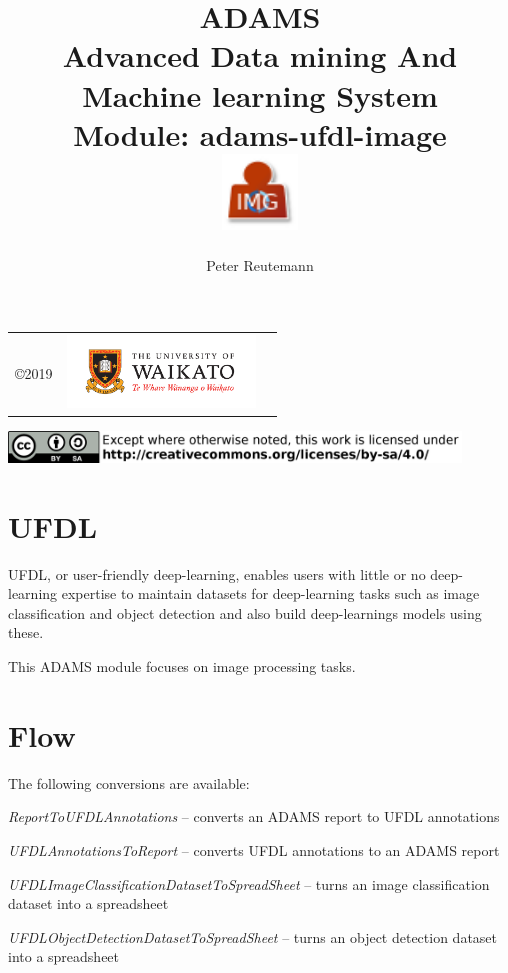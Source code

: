 \documentclass[a4paper]{book}
\title{
  \textbf{ADAMS} \\
  {\Large \textbf{A}dvanced \textbf{D}ata mining \textbf{A}nd \textbf{M}achine
  learning \textbf{S}ystem} \\
  {\Large Module: adams-ufdl-image} \\
  \vspace{1cm}
  \includegraphics[width=2cm]{images/ufdl-image-module.png} \\
}
\author{
  Peter Reutemann
}
\begin{document}
\begin{titlepage}
\maketitle

\thispagestyle{empty}
\center
\begin{table}[b]
	\begin{tabular}{c l l}
		\parbox[c][2cm]{2cm}{\copyright 2019} &
		\parbox[c][2cm]{5cm}{\includegraphics[width=5cm]{images/coat_of_arms.pdf}} \\
	\end{tabular}
	\includegraphics[width=12cm]{images/cc.png} \\
\end{table}

\end{titlepage}

\tableofcontents

\chapter{UFDL}
UFDL, or user-friendly deep-learning, enables users with little or no deep-learning
expertise to maintain datasets for deep-learning tasks such as image classification
and object detection and also build deep-learnings models using these.

This ADAMS module focuses on image processing tasks.

\chapter{Flow}

The following conversions are available:
\begin{tight_itemize}
  \item \textit{ReportToUFDLAnnotations} -- converts an ADAMS report to UFDL annotations
  \item \textit{UFDLAnnotationsToReport} -- converts UFDL annotations to an ADAMS report
  \item \textit{UFDLImageClassificationDatasetToSpreadSheet} -- turns an image classification dataset into a spreadsheet
  \item \textit{UFDLObjectDetectionDatasetToSpreadSheet} -- turns an object detection dataset into a spreadsheet
\end{tight_itemize}
\end{document}
